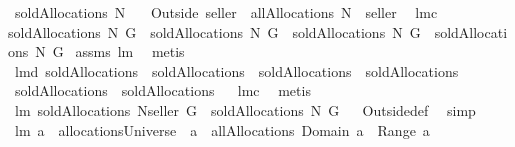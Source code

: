 \begin{isabellebody}
\isamarkupfalse%
\ {\isachardoublequoteopen}soldAllocations{\isacharprime}{\isacharprime}\ N\ {\isasymOmega}\ {\isacharequal}{\isacharequal}\ \isanewline
{\isacharparenleft}Outside{\isacharprime}\ {\isacharbraceleft}seller{\isacharbraceright}{\isacharparenright}\ {\isacharbackquote}\ {\isacharparenleft}allAllocations{\isacharprime}{\isacharprime}\ {\isacharparenleft}N\ {\isasymunion}\ {\isacharbraceleft}seller{\isacharbraceright}{\isacharparenright}\ {\isasymOmega}{\isacharparenright}{\isachardoublequoteclose}\isanewline
{}\isamarkupfalse%
\ lm{}{}c{\isacharcolon}\ \isanewline
{\isachardoublequoteopen}soldAllocations\ N\ G\ {\isacharequal}\ soldAllocations{\isacharprime}\ N\ G\ {\isacharampersand}\ soldAllocations{\isacharprime}\ N\ G\ {\isacharequal}\ soldAllocations{\isacharprime}{\isacharprime}\ N\ G{\isachardoublequoteclose}\isanewline
%
\isadelimproof
%
\endisadelimproof
%
\isatagproof
{}\isamarkupfalse%
\ assms\ lm{}{}\ \isamarkupfalse%
\ metis%
\endisatagproof
{\isafoldproof}%
%
\isadelimproof
\isanewline
%
\endisadelimproof
{}\isamarkupfalse%
\ lm{}{}d{\isacharcolon}\ {\isachardoublequoteopen}soldAllocations\ {\isacharequal}\ soldAllocations{\isacharprime}\ {\isacharampersand}\ soldAllocations{\isacharprime}\ {\isacharequal}\ soldAllocations{\isacharprime}{\isacharprime}\isanewline
{\isacharampersand}\ soldAllocations\ {\isacharequal}\ soldAllocations{\isacharprime}{\isacharprime}{\isachardoublequoteclose}%
\isadelimproof
\ %
\endisadelimproof
%
\isatagproof
{}\isamarkupfalse%
\ lm{}{}c\ \isamarkupfalse%
\ metis%
\endisatagproof
{\isafoldproof}%
%
\isadelimproof
%
\endisadelimproof
\isanewline
{}\isamarkupfalse%
\ lm{}{}{\isacharcolon}\ {\isachardoublequoteopen}soldAllocations\ {\isacharparenleft}N{\isacharminus}{\isacharbraceleft}seller{\isacharbraceright}{\isacharparenright}\ G\ {\isasymsubseteq}\ soldAllocations\ N\ G{\isachardoublequoteclose}%
\isadelimproof
\ %
\endisadelimproof
%
\isatagproof
{}\isamarkupfalse%
\ Outside{\isacharunderscore}def\ \isamarkupfalse%
\ simp%
\endisatagproof
{\isafoldproof}%
%
\isadelimproof
%
\endisadelimproof
\isanewline
\isanewline
{}\isamarkupfalse%
\ lm{}{}{\isacharcolon}\ {\isachardoublequoteopen}{\isacharparenleft}a\ {\isasymin}\ allocationsUniverse{\isacharparenright}\ {\isacharequal}\ {\isacharparenleft}a\ {\isasymin}\ allAllocations{\isacharprime}{\isacharprime}\ {\isacharparenleft}Domain\ a{\isacharparenright}\ {\isacharparenleft}{\isasymUnion}\ Range\ a{\isacharparenright}{\isacharparenright}{\isachardoublequoteclose}\isanewline

\end{isabellebody}
